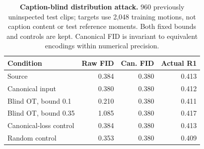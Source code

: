 \begin{table}[t]\centering\small
\caption{\textbf{Caption-blind distribution attack.} 960 previously uninspected test clips; targets use 2,048 training motions, not caption content or test reference moments. Both fixed bounds and controls are kept. Canonical FID is invariant to equivalent encodings within numerical precision.}
\label{tab:humanmlblind}
\begin{tabular}{lrrr}\toprule
Condition&Raw FID&Can. FID&Actual R1\\\midrule
Source&0.384&0.380&0.413\\
Canonical input&0.380&0.380&0.412\\
Blind OT, bound 0.1&0.210&0.380&0.411\\
Blind OT, bound 0.35&1.085&0.380&0.417\\
Canonical-loss control&0.384&0.380&0.413\\
Random control&0.353&0.380&0.409\\
\bottomrule\end{tabular}\end{table}
